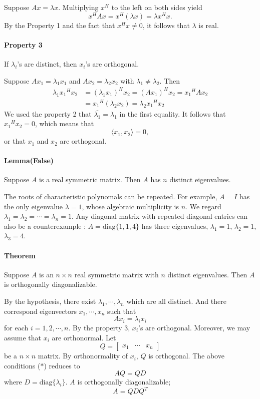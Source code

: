 \documentclass{article}
\begin{document}
\medskip
Suppose \(Ax=\lambda x\).
Multiplying $x^H$ to the left on both sides yield
\[x^HAx=x^H(\lambda x)=\lambda x^Hx.\]
By the Property 1 and the fact that $x^Hx\neq0$, it follows that $\lambda$ is real.

\paragraph{Property 3}
If $\lambda_i$'s are distinct, then $x_i$'s are orthogonal.

\medskip
Suppose $Ax_1=\lambda_1x_1$ and $Ax_2=\lambda_2x_2$ with $\lambda_1\neq\lambda_2$.
Then
\begin{align*}
\lambda_1{x_1}^Hx_2
&=(\lambda_1x_1)^Hx_2=(Ax_1)^Hx_2={x_1}^HAx_2\\
&={x_1}^H(\lambda_2x_2)=\lambda_2{x_1}^Hx_2
\end{align*}
We used the property 2 that $\overline{\lambda_1}=\lambda_1$ in the first equality.
It follows that \({x_1}^Hx_2=0\), which means that
\[\langle x_1,x_2\rangle=0,\]
or that $x_1$ and $x_2$ are orthogonal.

\paragraph{Lemma(False)}
Suppose $A$ is a real symmetric matrix.
Then $A$ has $n$ distinct eigenvalues.

\medskip
The roots of characteristic polynomals can be repeated.
For example, $A=I$ has the only eigenvalue $\lambda=1$, whose algebraic multiplicity is $n$.
We regard $\lambda_1=\lambda_2=\cdots=\lambda_n=1$.
Any diagonal matrix with repeated diagonal entries can also be a counterexample :
$A=\text{diag}\{1,1,4\}$ has three eigenvalues, $\lambda_1=1$, $\lambda_2=1$, $\lambda_3=4$.

\paragraph{Theorem}
Suppose $A$ is an $n\times n$ real symmetric matrix with $n$ distinct eigenvalues.
Then $A$ is orthogonally diagonalizable.

\medskip
By the hypothesis, there exist $\lambda_1,\cdots,\lambda_n$ which are all distinct.
And there correspond eigenvectors $x_1,\cdots,x_n$ such that
\[Ax_i=\lambda_ix_i\tag{$*$}\]
for each $i=1,2,\cdots,n$.
By the property 3, $x_i$'s are orthogonal.
Moreover, we may assume that $x_i$ are orthonormal.
Let
\[Q=\begin{bmatrix}
x_1&\cdots&x_n
\end{bmatrix}\]
be a $n\times n$ matrix.
By orthonormality of $x_i$, $Q$ is orthogonal.
The above conditions ($*$) reduces to
\[AQ=QD\]
where $D=\text{diag}\{\lambda_i\}$.
$A$ is orthogonally diagonalizable;
\[A=QDQ^T\]
\end{document}
